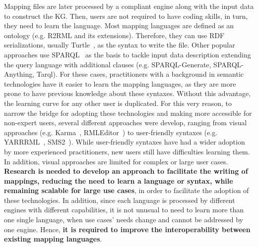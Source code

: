 
Mapping files are later processed by a compliant engine along with the input data to construct the KG. Then, users are not required to have coding skills, in turn, they need to learn the language. Most mapping languages are defined as an ontology (e.g. R2RML and its extensions). Therefore, they can use RDF serializations, usually Turtle~\parencite{turtle}, as the syntax to write the file. Other popular approaches use SPARQL~\parencite{harris2013sparql} as the basis to tackle input data description extending the query language with additional clauses (e.g. SPARQL-Generate, SPARQL-Anything, Tarql). For these cases, practitioners with a background in semantic technologies have it easier to learn the mapping languages, as they are more prone to have previous knowledge about these syntaxes. Without this advantage, the learning curve for any other user is duplicated. For this very reason, to narrow the bridge for adopting these technologies and making more accessible for non-expert users, several different approaches were develop, ranging from visual approaches (e.g. Karma~\parencite{gupta2012karma}, RMLEditor~\parencite{heyvaert2016rmleditor}) to user-friendly syntaxes (e.g. YARRRML~\parencite{Heyvaert2018yarrrml}, SMS2~\parencite{sms2}). While user-friendly syntaxes have had a wider adoption by more experienced practitioners, new users still have difficulties learning them. In addition, visual approaches are limited for complex or large user cases. \textbf{Research is needed to develop an approach to facilitate the writing of mappings, reducing the need to learn a language or syntax, while remaining scalable for large use cases}, in order to facilitate the adoption of these technologies. In addition, since each language is processed by different engines with different capabilities, it is not unusual to need to learn more than one single language, when use cases' needs change and cannot be addressed by one engine. Hence, \textbf{it is required to improve the interoperability between existing mapping languages}. 

